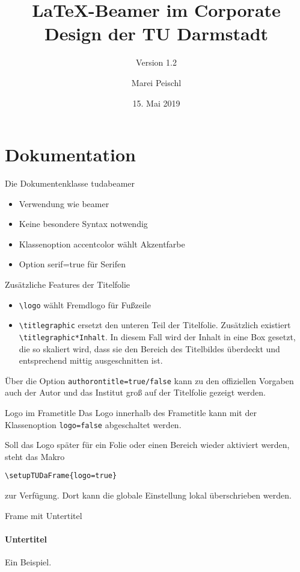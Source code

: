 \documentclass[
	german,%
	aspectratio=169,%
	accentcolor=2d,%
	logo=false,%
	colorframetitle=true,%
	design=2008,  %
]{tudabeamer}
\title{LaTeX-Beamer im Corporate Design der TU Darmstadt}
\subtitle{Version 1.2}
\author[M. Peischl]{Marei Peischl}
\institute{pei\TeX}
\date{15. Mai 2019}
\let\code\texttt
\begin{document}
\maketitle

\section{Dokumentation}
\begin{frame}{Die Dokumentenklasse tudabeamer}
	\begin{itemize}
		\item Verwendung wie beamer
		\item Keine besondere Syntax notwendig
		\item Klassenoption accentcolor wählt Akzentfarbe
		\item Option serif=true für Serifen
	\end{itemize}
\end{frame}

\begin{frame}{Zusätzliche Features der Titelfolie}
	\begin{itemize}
		\item \code{\textbackslash{}logo} wählt Fremdlogo für Fußzeile
		\item \code{\textbackslash{}titlegraphic} ersetzt den unteren Teil der Titelfolie. Zusätzlich existiert \code{\textbackslash{}titlegraphic*{Inhalt}}.
		      In diesem Fall wird der Inhalt in eine Box gesetzt, die so skaliert wird, dass sie den Bereich des Titelbildes überdeckt und entsprechend mittig ausgeschnitten ist.
	\end{itemize}
	Über die Option \code{authorontitle=true/false} kann zu den offiziellen Vorgaben auch der Autor und das Institut groß auf der Titelfolie gezeigt werden.
\end{frame}

\begin{frame}[fragile]{Logo im Frametitle}
	Das Logo innerhalb des Frametitle kann mit der Klassenoption \code{logo=false} abgeschaltet werden.

	Soll das Logo später für ein Folie oder einen Bereich wieder aktiviert werden, steht das Makro
\begin{verbatim}
\setupTUDaFrame{logo=true}
\end{verbatim}
	zur Verfügung. Dort kann die globale Einstellung lokal überschrieben werden.
\end{frame}

\begin{frame}{Frame mit Untertitel}
	\framesubtitle{Untertitel}
	Ein Beispiel.
\end{frame}
\end{document}
